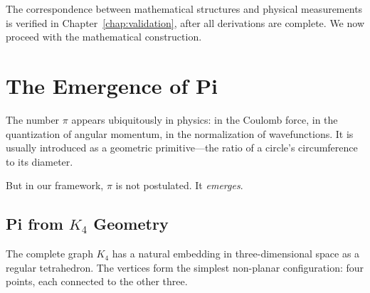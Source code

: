 \documentclass[11pt,a4paper]{book}
\def\texorpdfstring#1#2{#2}%
\begin{document}
The correspondence between mathematical structures and physical measurements is verified in Chapter~\ref{chap:validation}, after all derivations are complete. We now proceed with the mathematical construction.

\chapter{The Emergence of Pi}
\label{chap:pi}

The number $\pi$ appears ubiquitously in physics: in the Coulomb force, in the quantization 
of angular momentum, in the normalization of wavefunctions. It is usually introduced as a 
geometric primitive—the ratio of a circle's circumference to its diameter.

But in our framework, $\pi$ is not postulated. It \emph{emerges}.

\section{\texorpdfstring{$\pi$}{Pi} from $K_4$ Geometry}

The complete graph $K_4$ has a natural embedding in three-dimensional space as a regular 
tetrahedron. The vertices form the simplest non-planar configuration: four points, each 
connected to the other three.

\begin{center}
\end{center}
\end{document}
